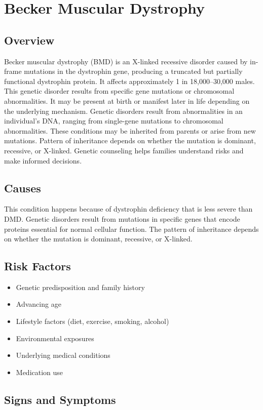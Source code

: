 \chapter{Becker Muscular Dystrophy}
\label{sec:Becker Muscular Dystrophy}

\section{Overview}
Becker muscular dystrophy (BMD) is an X-linked recessive disorder caused by in-frame mutations in the dystrophin gene, producing a truncated but partially functional dystrophin protein. It affects approximately 1 in 18,000--30,000 males. This genetic disorder results from specific gene mutations or chromosomal abnormalities. It may be present at birth or manifest later in life depending on the underlying mechanism. Genetic disorders result from abnormalities in an individual's DNA, ranging from single-gene mutations to chromosomal abnormalities. These conditions may be inherited from parents or arise from new mutations. Pattern of inheritance depends on whether the mutation is dominant, recessive, or X-linked. Genetic counseling helps families understand risks and make informed decisions.
\section{Causes}
This condition happens because of dystrophin deficiency that is less severe than DMD. Genetic disorders result from mutations in specific genes that encode proteins essential for normal cellular function. The pattern of inheritance depends on whether the mutation is dominant, recessive, or X-linked.   
\section{Risk Factors}

\begin{itemize}[noitemsep]
  \item Genetic predisposition and family history
  \item Advancing age
  \item Lifestyle factors (diet, exercise, smoking, alcohol)
  \item Environmental exposures
  \item Underlying medical conditions
  \item Medication use
\end{itemize}
\section{Signs and Symptoms}

